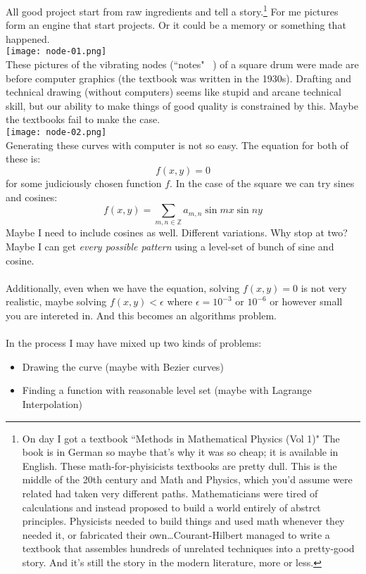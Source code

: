 \documentclass[12pt]{article}
\begin{document}
\noindent All good project start from raw ingredients and tell a story.\footnote{On day I got a textbook ``Methods in Mathematical Physics (Vol 1)"  The book is in German so maybe that's why it was so cheap; it is available in English.  These math-for-phyisicists textbooks are pretty dull.  This is the middle of the 20th century and Math and Physics, which you'd assume were related had taken very different paths.  Mathematicians were tired of calculations and instead proposed to build a world entirely of abstrct principles.  Physicists needed to build things and used math whenever they needed it, or fabricated their own\dots Courant-Hilbert managed to write a textbook that assembles hundreds of unrelated techniques into a pretty-good story.  And it's still the story in the modern literature, more or less.}  For me pictures form an engine that start projects.  Or it could be a memory or something that happened. \\
\texttt{[image: node-01.png]} \\ 
These pictures of the vibrating nodes (``notes" \quarternote\twonotes\quarternote\, ) of a square drum were made are before computer graphics (the textbook was written in the 1930s). Drafting and technical drawing (without computers) seems like stupid and arcane technical skill, but our ability to make things of good quality is constrained by this.  Maybe the textbooks fail to make the case. \\
\texttt{[image: node-02.png]} \\ 
Generating these curves with computer is not so easy.  The equation for both of these is:
$$ f(x,y) = 0 $$
for some judiciously chosen function $f$.  In the case of the square we can try sines and cosines:
$$ f(x,y) = \sum_{m, n \in \mathbb{Z}} a_{m,n} \sin m x \sin n y$$
Maybe I need to include cosines as well.  Different variations.  Why stop at two?  Maybe I can get \textit{every possible pattern} using a level-set of bunch of sine and cosine. \\ \\Additionally, even when we have the equation, solving $f(x,y) = 0$ is not very realistic, maybe solving $f(x,y) < \epsilon$ where $\epsilon =  10^{-3}$ or $10^{-6}$ or however small you are intereted in.  And this becomes an algorithms problem. \\ \\
In the process I may have mixed up two kinds of problems:
\begin{itemize}
\item Drawing the curve (maybe with Bezier curves)
\item Finding a function with reasonable level set (maybe with Lagrange Interpolation)
\end{itemize}
\end{document}

